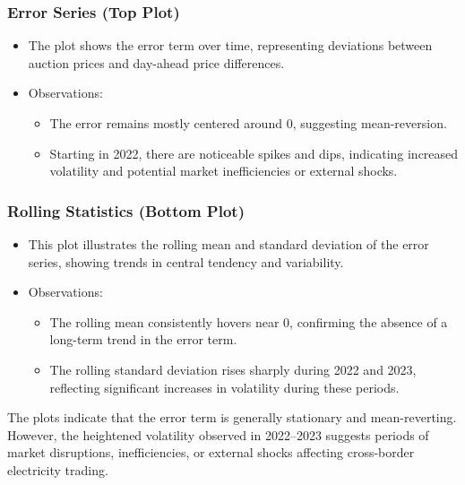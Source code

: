 \documentclass[12pt]{article}
\begin{document}
\subsubsection {Error Series (Top Plot)}
\begin{itemize}
    \item The plot shows the error term over time, representing deviations between auction prices and day-ahead price differences.
    \item {Observations}:
    \begin{itemize}
        \item The error remains mostly centered around 0, suggesting mean-reversion.
        \item Starting in 2022, there are noticeable spikes and dips, indicating increased volatility and potential market inefficiencies or external shocks.
    \end{itemize}
\end{itemize}

\subsubsection {Rolling Statistics (Bottom Plot)}

\begin{itemize}
    \item This plot illustrates the rolling mean and standard deviation of the error series, showing trends in central tendency and variability.
    \item {Observations}:
    \begin{itemize}
        \item The rolling mean consistently hovers near 0, confirming the absence of a long-term trend in the error term.
        \item The rolling standard deviation rises sharply during 2022 and 2023, reflecting significant increases in volatility during these periods.
    \end{itemize}
\end{itemize}

\noindent The plots indicate that the error term is generally stationary and mean-reverting. However, the heightened volatility observed in 2022–2023 suggests periods of market disruptions, inefficiencies, or external shocks affecting cross-border electricity trading.
\end{document}
